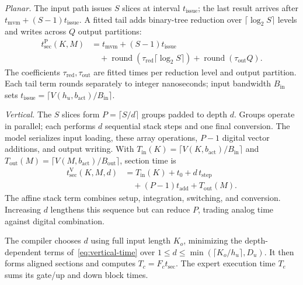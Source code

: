 \textit{Planar.} The input path issues $S$ slices at interval $t_{\mathrm{issue}}$; the last result arrives after $t_{\mathrm{mvm}}+(S-1)t_{\mathrm{issue}}$. A fitted tail adds binary-tree reduction over $\lceil\log_2 S\rceil$ levels and writes across $Q$ output partitions:
\begin{equation}
  \begin{aligned}
    t_{\mathrm{sec}}^{\mathrm{P}}(K,M)
      &=t_{\mathrm{mvm}}+(S-1)t_{\mathrm{issue}}\\
      &\quad+\operatorname{round}\!\left(\tau_{\mathrm{red}}\lceil\log_2 S\rceil\right)
      +\operatorname{round}(\tau_{\mathrm{out}}Q).
  \end{aligned}
  \label{eq:planar-time}
\end{equation}
The coefficients $\tau_{\mathrm{red}},\tau_{\mathrm{out}}$ are fitted times per reduction level and output partition. Each tail term rounds separately to integer nanoseconds; input bandwidth $B_{\mathrm{in}}$ sets $t_{\mathrm{issue}}=\lceil V(h_u,b_{\mathrm{act}})/B_{\mathrm{in}}\rceil$.

\textit{Vertical.} The $S$ slices form $P=\lceil S/d\rceil$ groups padded to depth $d$. Groups operate in parallel; each performs $d$ sequential stack steps and one final conversion. The model serializes input loading, these array operations, $P-1$ digital vector additions, and output writing. With $T_{\mathrm{in}}(K)=\lceil V(K,b_{\mathrm{act}})/B_{\mathrm{in}}\rceil$ and $T_{\mathrm{out}}(M)=\lceil V(M,b_{\mathrm{act}})/B_{\mathrm{out}}\rceil$, section time is
\begin{equation}
  \begin{aligned}
    t_{\mathrm{sec}}^{\mathrm{V}}(K,M,d)
      &=T_{\mathrm{in}}(K)+t_0+d\,t_{\mathrm{step}}\\
      &\quad+(P-1)t_{\mathrm{add}}+T_{\mathrm{out}}(M).
  \end{aligned}
  \label{eq:vertical-time}
\end{equation}
The affine stack term combines setup, integration, switching, and conversion. Increasing $d$ lengthens this sequence but can reduce $P$, trading analog time against digital combination.

The compiler chooses $d$ using full input length $K_o$, minimizing the depth-dependent terms of~\eqref{eq:vertical-time} over $1\leq d\leq\min(\lceil K_o/h_u\rceil,D_u)$. It then forms aligned sections and computes $T_c=F_ct_{\mathrm{sec}}$. The expert execution time $T_e$ sums its gate/up and down block times.

